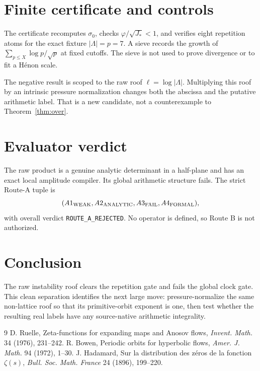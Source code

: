 \documentclass[11pt]{article}
\theoremstyle{remark}\newtheorem{remark}[theorem]{Remark}
\begin{document}
\section{Finite certificate and controls}
The certificate recomputes $\sigma_0$, checks
$\varphi/\sqrt{J_*}<1$, and verifies eight repetition atoms for the exact
fixture $|\Lambda|=p=7$.  A sieve records the growth of
$\sum_{p\le X}\log p/\sqrt p$ at fixed cutoffs.  The sieve is not used to
prove divergence or to fit a H\'enon scale.

The negative result is scoped to the raw roof $\ell=\log|\Lambda|$.
Multiplying this roof by an intrinsic pressure normalization changes both the
abscissa and the putative arithmetic label.  That is a new candidate, not a
counterexample to Theorem~\ref{thm:over}.

\section{Evaluator verdict}
The raw product is a genuine analytic determinant in a half-plane and has an
exact local amplitude compiler.  Its global arithmetic structure fails.
The strict Route-A tuple is
\[
(A1_{\rm WEAK},A2_{\rm ANALYTIC},A3_{\rm FAIL},A4_{\rm FORMAL}),
\]
with overall verdict \texttt{ROUTE\_A\_REJECTED}.  No operator is defined,
so Route B is not authorized.

\section{Conclusion}
The raw instability roof clears the repetition gate and fails the global
clock gate.  This clean separation identifies the next large move:
pressure-normalize the same non-lattice roof so that its primitive-orbit
exponent is one, then test whether the resulting real labels have any
source-native arithmetic integrality.

\begin{thebibliography}{9}
D. Ruelle, Zeta-functions for expanding maps and Anosov flows,
\emph{Invent. Math.} 34 (1976), 231--242.
R. Bowen, Periodic orbits for hyperbolic flows,
\emph{Amer. J. Math.} 94 (1972), 1--30.
J. Hadamard, Sur la distribution des z\'eros de la fonction $\zeta(s)$,
\emph{Bull. Soc. Math. France} 24 (1896), 199--220.
\end{thebibliography}
\end{document}
